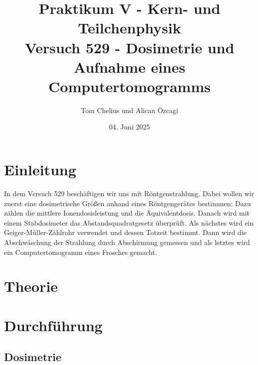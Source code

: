 \documentclass{article}
\title{Praktikum V - Kern- und Teilchenphysik\\Versuch 529 - Dosimetrie und Aufnahme eines Computertomogramms}
\author{Tom Chelius und Alican Özcagi}
\date{04. Juni 2025}
\begin{document}
\maketitle
\newpage
\tableofcontents

\newpage

\section{Einleitung}

In dem Versuch 529 beschäftigen wir uns mit Röntgenstrahlung. 
Dabei wollen wir zuerst eine dosimetrische Größen anhand eines Röntgengerätes bestimmen: Dazu zählen die mittlere Ionendosisleistung und die Äquivalentdosis.
Danach wird mit einem Stabdosimeter das Abstandsquadratgesetz überprüft.
Als nächstes wird ein Geiger-Müller-Zählrohr verwendet und dessen Totzeit bestimmt.
Dann wird die Abschwäschung der Strahlung durch Abschirmung gemessen und als letztes wird ein Computertomogramm eines Frosches gemacht.
\section{Theorie}


\section{Durchführung}

\subsection{Dosimetrie}
\end{document}
